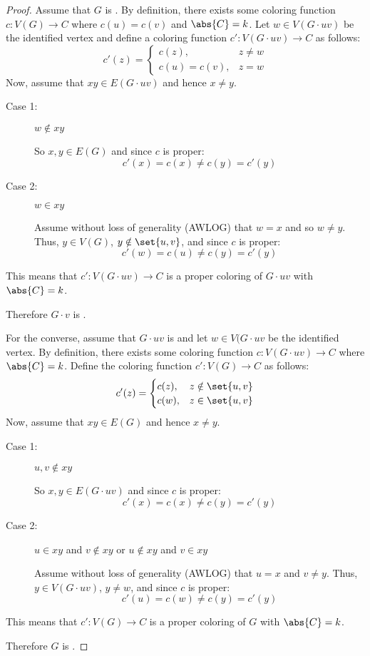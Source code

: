 \begin{proof}
  Assume that \(G\) is .  By definition, there exists some coloring function \(c:V(G)\to C\) where
  \(c(u)=c(v)\) and \(\abs{C}=k\).  Let \(w\in V(G\cdot uv)\) be the identified vertex and define a coloring function
  \(c':V(G\cdot uv)\to C\) as follows:
  \[c'(z)=\begin{cases}
  c(z), & z\ne w \\
  c(u)=c(v), & z=w
  \end{cases}\]
  Now, assume that \(xy\in E(G\cdot uv)\) and hence \(x\ne y\).
  \begin{description}
  \item[Case 1:] \(w\notin xy\)

    So \(x,y\in E(G)\) and since \(c\) is proper:
    \[c'(x)=c(x)\ne c(y)=c'(y)\]

  \item[Case 2:] \(w\in xy\)

    Assume without loss of generality (AWLOG) that \(w=x\) and so \(w\ne y\).  Thus, \(y\in V(G)\),
    \(y\notin\set{u,v}\), and since \(c\) is proper:
    \[c'(w)=c(u)\ne c(y)=c'(y)\]
  \end{description}

  This means that \(c':V(G\cdot uv)\to C\) is a proper coloring of \(G\cdot uv\) with \(\abs{C}=k\).

  Therefore \(G\cdot v\) is .

  For the converse, assume that \(G\cdot uv\) is  and let \(w\in V(G\cdot uv\) be the identified
  vertex.  By definition, there exists some coloring function \(c:V(G\cdot uv)\to C\) where \(\abs{C}=k\).  Define
  the coloring function \(c':V(G)\to C\) as follows:
  \[c'(z)=\begin{cases}
  c(z), & z\notin\set{u,v} \\
  c(w), & z\in\set{u,v}
  \end{cases}\]
  Now, assume that \(xy\in E(G)\) and hence \(x\ne y\).
  \begin{description}
  \item[Case 1:] \(u,v\notin xy\)

    So \(x,y\in E(G\cdot uv)\) and since \(c\) is proper:
    \[c'(x)=c(x)\ne c(y)=c'(y)\]

  \item[Case 2:] \(u\in xy\) and \(v\notin xy\) or \(u\notin xy\) and \(v\in xy\)

    Assume without loss of generality (AWLOG) that \(u=x\) and \(v\ne y\).  Thus, \(y\in V(G\cdot uv)\),
    \(y\ne w\), and since \(c\) is proper:
    \[c'(u)=c(w)\ne c(y)=c'(y)\]
  \end{description}

  This means that \(c':V(G)\to C\) is a proper coloring of \(G\) with \(\abs{C}=k\).

  Therefore \(G\) is .
\end{proof}

